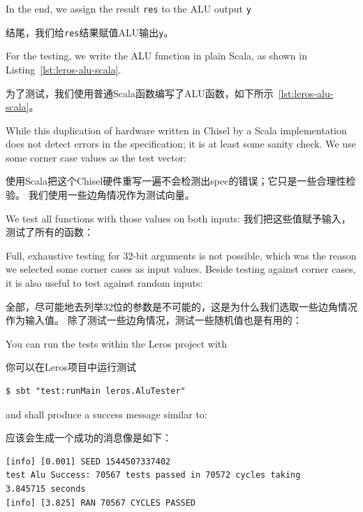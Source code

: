 \documentclass[%
    10pt,
    headinclude, footexclude,
    openright, %
    notitlepage,
    cleardoubleempty,
    headsepline,
    pointlessnumbers,
    bibtotoc, idxtotoc,
    ]{scrbook}
\newcommand{\code}[1]{{\small{\texttt{#1}}}}
\begin{document}
In the end, we assign the result \code{res} to the ALU output \code{y}

结尾，我们给\code{res}结果赋值ALU输出\code{y}。


For the testing, we write the ALU function in plain Scala, as shown in Listing~\ref{lst:leros-alu-scala}.

为了测试，我们使用普通Scala函数编写了ALU函数，如下所示~\ref{lst:leros-alu-scala}。


\noindent While this duplication of hardware written in Chisel by a Scala implementation does not
detect errors in the specification; it is at least some sanity check.
We use some corner case values as the test vector:

\noindent 使用Scala把这个Chisel硬件重写一遍不会检测出spec的错误；它只是一些合理性检验。
我们使用一些边角情况作为测试向量。


\noindent We test all functions with those values on both inputs:
\noindent 我们把这些值赋予输入，测试了所有的函数：


\noindent Full, exhaustive testing for 32-bit arguments is not possible, which was the reason we
selected some corner cases as input values. Beside testing against corner cases, it is also useful
to test against random inputs:

\noindent 全部，尽可能地去列举32位的参数是不可能的，这是为什么我们选取一些边角情况作为输入值。
除了测试一些边角情况，测试一些随机值也是有用的：


\noindent You can run the tests within the Leros project with

\noindent 你可以在Leros项目中运行测试

\begin{verbatim}
$ sbt "test:runMain leros.AluTester"
\end{verbatim}

and shall produce a success message similar to:

应该会生成一个成功的消息像是如下：

\begin{verbatim}
[info] [0.001] SEED 1544507337402
test Alu Success: 70567 tests passed in 70572 cycles taking
3.845715 seconds
[info] [3.825] RAN 70567 CYCLES PASSED
\end{verbatim}
\end{document}
